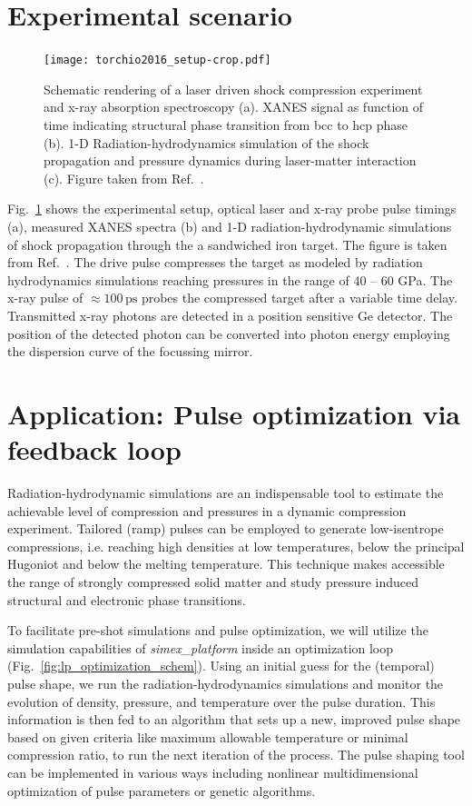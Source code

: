 \documentclass[10pt]{scrartcl}
\begin{document}
\section{Experimental scenario}
\begin{figure}[ht]
  \begin{center}
    \texttt{[image: torchio2016\_setup-crop.pdf]}
  \end{center}
  \caption{Schematic rendering of a laser driven shock compression experiment
  and x-ray absorption spectroscopy (a). XANES signal as function of time
indicating structural phase transition from bcc to hcp phase (b). 1-D
Radiation-hydrodynamics simulation of the shock
propagation and pressure dynamics during laser-matter interaction (c).
Figure taken from Ref.~\cite{Torchio2016}.}
  \label{fig:exp_setup}
\end{figure}
%
Fig.~\ref{fig:exp_setup} shows the experimental setup, optical laser and x-ray
probe pulse timings (a), measured XANES spectra (b) and 1-D radiation-hydrodynamic
simulations of shock propagation through the a sandwiched iron target.
The figure is taken from Ref.~\cite{Torchio2016}. The drive pulse compresses the
target as modeled by radiation hydrodynamics simulations reaching pressures in
the range of 40 -- 60 GPa. The x-ray pulse of $\approx 100\,\text{ps}$ probes
the compressed target after a variable time delay. Transmitted x-ray photons are
detected in a position sensitive Ge detector. The position of the detected
photon can be converted into photon energy employing the dispersion curve of the
focussing mirror.

\section{Application: Pulse optimization via feedback loop}
Radiation-hydrodynamic simulations are an indispensable tool to estimate the
achievable level of compression and pressures in a dynamic compression
experiment. Tailored (ramp) pulses can be employed to generate low-isentrope
compressions, i.e. reaching high densities at low temperatures, below the
principal Hugoniot and below the melting temperature. This technique makes
accessible the range of strongly compressed solid matter and study pressure
induced structural and electronic phase transitions.

To facilitate pre-shot simulations and pulse optimization, we will utilize the
simulation capabilities of \textit{simex\_platform} inside an optimization loop (Fig.~\ref{fig:lp_optimization_schem}).
Using an initial guess for the (temporal) pulse shape, we run the
radiation-hydrodynamics simulations and monitor the evolution of density,
pressure, and temperature over the pulse duration. This information is then fed
to an algorithm that sets up a new, improved pulse shape based on given criteria
like maximum allowable temperature or minimal compression ratio, to run the next
iteration of the process.
The pulse shaping tool can be implemented in various
ways including nonlinear multidimensional optimization of pulse parameters or genetic algorithms.
\end{document}
